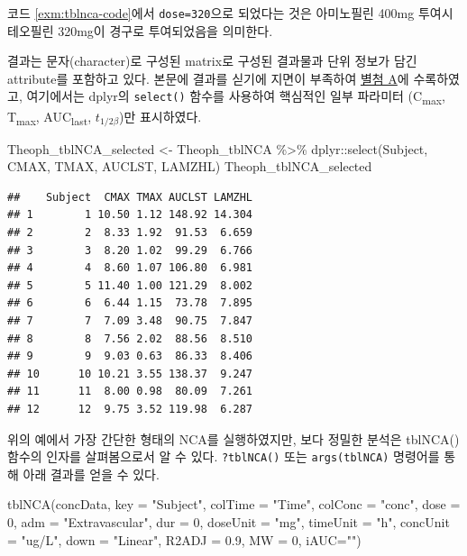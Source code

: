 \documentclass[
  11pt,
  krantz2, a4paper, twoside]{krantz}
\newenvironment{Shaded}{\begin{snugshade}}{\end{snugshade}}
\newcommand{\AttributeTok}[1]{\textcolor[rgb]{0.77,0.63,0.00}{#1}}
\newcommand{\DecValTok}[1]{\textcolor[rgb]{0.00,0.00,0.81}{#1}}
\newcommand{\FloatTok}[1]{\textcolor[rgb]{0.00,0.00,0.81}{#1}}
\newcommand{\FunctionTok}[1]{\textcolor[rgb]{0.00,0.00,0.00}{#1}}
\newcommand{\NormalTok}[1]{#1}
\newcommand{\OtherTok}[1]{\textcolor[rgb]{0.56,0.35,0.01}{#1}}
\newcommand{\SpecialCharTok}[1]{\textcolor[rgb]{0.00,0.00,0.00}{#1}}
\newcommand{\StringTok}[1]{\textcolor[rgb]{0.31,0.60,0.02}{#1}}
\theoremstyle{definition}
\theoremstyle{definition}
\theoremstyle{definition}
\theoremstyle{definition}
\theoremstyle{remark}
\begin{document}
코드 \ref{exm:tblnca-code}에서 \texttt{dose=320}으로 되었다는 것은 아미노필린 400mg 투여시 테오필린 320mg이 경구로 투여되었음을 의미한다.

결과는 문자(character)로 구성된 matrix로 구성된 결과물과 단위 정보가 담긴 attribute를 포함하고 있다.
본문에 결과를 싣기에 지면이 부족하여 \protect\hyperlink{Theoph_tblNCA}{별첨 A}에 수록하였고, 여기에서는 dplyr의 \texttt{select()} 함수를 사용하여 핵심적인 일부 파라미터 (C\textsubscript{max}, T\textsubscript{max}, AUC\textsubscript{last}, \(t_{1/2\beta}\))만 표시하였다.

\begin{Shaded}
\begin{Highlighting}[]
\NormalTok{Theoph\_tblNCA\_selected }\OtherTok{\textless{}{-}}\NormalTok{ Theoph\_tblNCA }\SpecialCharTok{\%\textgreater{}\%} 
\NormalTok{  dplyr}\SpecialCharTok{::}\FunctionTok{select}\NormalTok{(Subject, CMAX, TMAX, AUCLST, LAMZHL)}
\NormalTok{Theoph\_tblNCA\_selected}
\end{Highlighting}
\end{Shaded}

\begin{verbatim}
##    Subject  CMAX TMAX AUCLST LAMZHL
## 1        1 10.50 1.12 148.92 14.304
## 2        2  8.33 1.92  91.53  6.659
## 3        3  8.20 1.02  99.29  6.766
## 4        4  8.60 1.07 106.80  6.981
## 5        5 11.40 1.00 121.29  8.002
## 6        6  6.44 1.15  73.78  7.895
## 7        7  7.09 3.48  90.75  7.847
## 8        8  7.56 2.02  88.56  8.510
## 9        9  9.03 0.63  86.33  8.406
## 10      10 10.21 3.55 138.37  9.247
## 11      11  8.00 0.98  80.09  7.261
## 12      12  9.75 3.52 119.98  6.287
\end{verbatim}

위의 예에서 가장 간단한 형태의 NCA를 실행하였지만, 보다 정밀한 분석은 tblNCA() 함수의 인자를 살펴봄으로서 알 수 있다. \texttt{?tblNCA()} 또는 \texttt{args(tblNCA)} 명령어를 통해 아래 결과를 얻을 수 있다.

\begin{Shaded}
\begin{Highlighting}[]
\FunctionTok{tblNCA}\NormalTok{(concData, }\AttributeTok{key =} \StringTok{"Subject"}\NormalTok{, }\AttributeTok{colTime =} \StringTok{"Time"}\NormalTok{, }\AttributeTok{colConc =} \StringTok{"conc"}\NormalTok{, }
       \AttributeTok{dose =} \DecValTok{0}\NormalTok{, }\AttributeTok{adm =} \StringTok{"Extravascular"}\NormalTok{, }\AttributeTok{dur =} \DecValTok{0}\NormalTok{, }\AttributeTok{doseUnit =} \StringTok{"mg"}\NormalTok{, }
       \AttributeTok{timeUnit =} \StringTok{"h"}\NormalTok{, }\AttributeTok{concUnit =} \StringTok{"ug/L"}\NormalTok{, }\AttributeTok{down =} \StringTok{"Linear"}\NormalTok{, }\AttributeTok{R2ADJ =} \FloatTok{0.9}\NormalTok{, }
       \AttributeTok{MW =} \DecValTok{0}\NormalTok{, }\AttributeTok{iAUC=}\StringTok{""}\NormalTok{)}
\end{Highlighting}
\end{Shaded}
\end{document}
